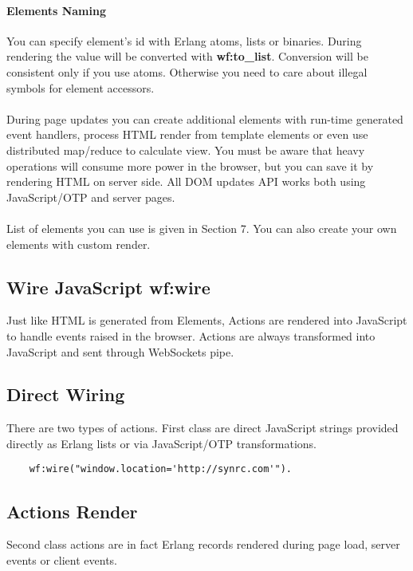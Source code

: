 \paragraph{\bf Elements Naming}
You can specify element's id with Erlang atoms,
lists or binaries. During rendering the value will be converted
with {\bf wf:to\_list}. Conversion will be consistent only if you use atoms.
Otherwise you need to care about illegal symbols for element accessors.

\paragraph{}
During page updates you can create additional elements with
run-time generated event handlers, process HTML render from
template elements or even use distributed map/reduce to calculate view.
You must be aware that heavy operations will consume
more power in the browser, but you can save it by rendering
HTML on server side. All DOM updates API works both using
JavaScript/OTP and server pages.

\paragraph{}
List of elements you can use is given in Section 7. You can also create
your own elements with custom render.

\subsection{Wire JavaScript \bf{wf:wire}}
Just like HTML is generated from Elements, Actions are rendered into
JavaScript to handle events raised in the browser. Actions are always
transformed into JavaScript and sent through WebSockets pipe.

\subsection*{Direct Wiring}
There are two types of actions. First class are direct JavaScript
strings provided directly as Erlang lists or via JavaScript/OTP
transformations.

\vspace{1\baselineskip}
\begin{lstlisting}
    wf:wire("window.location='http://synrc.com'").
\end{lstlisting}

\subsection*{Actions Render}
Second class actions are in fact Erlang records
rendered during page load, server events or client events.

